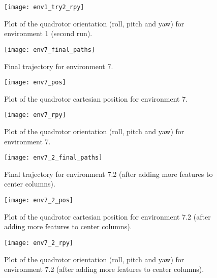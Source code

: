 \documentclass{article}
\begin{document}
  \begin{figure}[H]
    \begin{center}
      \texttt{[image: env1\_try2\_rpy]}
    \end{center} 
    \caption{Plot of the quadrotor orientation (roll, pitch and yaw) for environment 1 (second run).}
  \end{figure}


  \begin{figure}[H]
    \begin{center}
      \texttt{[image: env7\_final\_paths]}
    \end{center} 
    \caption{Final trajectory for environment 7.}
  \end{figure}

  \begin{figure}[H]
    \begin{center}
      \texttt{[image: env7\_pos]}
    \end{center} 
    \caption{Plot of the quadrotor cartesian position for environment 7.}
  \end{figure}

  \begin{figure}[H]
    \begin{center}
      \texttt{[image: env7\_rpy]}
    \end{center} 
    \caption{Plot of the quadrotor orientation (roll, pitch and yaw) for environment 7.}
  \end{figure}


  \begin{figure}[H]
    \begin{center}
      \texttt{[image: env7\_2\_final\_paths]}
    \end{center} 
    \caption{Final trajectory for environment 7.2 (after adding more features to center columns).}
  \end{figure}

  \begin{figure}[H]
    \begin{center}
      \texttt{[image: env7\_2\_pos]}
    \end{center} 
    \caption{Plot of the quadrotor cartesian position for environment 7.2 (after adding more features to center columns).}
  \end{figure}

  \begin{figure}[H]
    \begin{center}
      \texttt{[image: env7\_2\_rpy]}
    \end{center} 
    \caption{Plot of the quadrotor orientation (roll, pitch and yaw) for environment 7.2 (after adding more features to center columns).}
  \end{figure}

 
\end{document}
